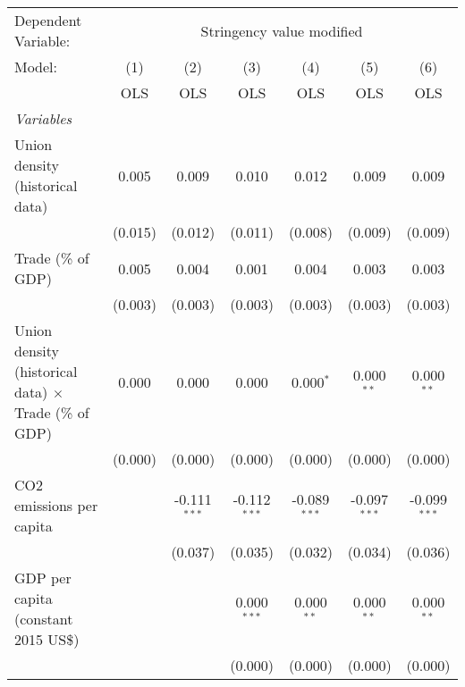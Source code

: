 
\begingroup
\centering
\begin{tabular}{lcccccc}
   \toprule
   Dependent Variable: & \multicolumn{6}{c}{Stringency value modified}\\
   Model:                                                       & (1)     & (2)            & (3)            & (4)            & (5)            & (6)\\  
                                                                &  OLS    & OLS            & OLS            & OLS            & OLS            & OLS\\  
   \midrule
   \emph{Variables}\\
   Union density (historical data)                              & 0.005   & 0.009          & 0.010          & 0.012          & 0.009          & 0.009\\   
                                                                & (0.015) & (0.012)        & (0.011)        & (0.008)        & (0.009)        & (0.009)\\   
   Trade (\% of GDP)                                            & 0.005   & 0.004          & 0.001          & 0.004          & 0.003          & 0.003\\   
                                                                & (0.003) & (0.003)        & (0.003)        & (0.003)        & (0.003)        & (0.003)\\   
   Union density (historical data) $\times$ Trade (\% of GDP)   & 0.000   & 0.000          & 0.000          & 0.000$^{*}$    & 0.000$^{**}$   & 0.000$^{**}$\\   
                                                                & (0.000) & (0.000)        & (0.000)        & (0.000)        & (0.000)        & (0.000)\\   
   CO2 emissions per capita                                     &         & -0.111$^{***}$ & -0.112$^{***}$ & -0.089$^{***}$ & -0.097$^{***}$ & -0.099$^{***}$\\   
                                                                &         & (0.037)        & (0.035)        & (0.032)        & (0.034)        & (0.036)\\   
   GDP per capita (constant 2015 US\$)                          &         &                & 0.000$^{***}$  & 0.000$^{**}$   & 0.000$^{**}$   & 0.000$^{**}$\\   
                                                                &         &                & (0.000)        & (0.000)        & (0.000)        & (0.000)\\   

\end{tabular}
